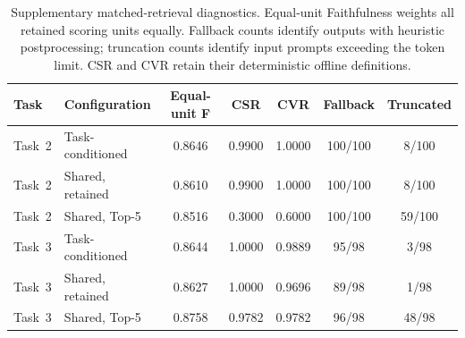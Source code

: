 \begin{table}[ht]
\centering
\scriptsize
\caption{Supplementary matched-retrieval diagnostics. Equal-unit Faithfulness weights all retained scoring units equally. Fallback counts identify outputs with heuristic postprocessing; truncation counts identify input prompts exceeding the token limit. CSR and CVR retain their deterministic offline definitions.}
\label{tab:single-pipeline-rag-baseline}
\setlength{\tabcolsep}{3pt}
\renewcommand{\arraystretch}{1.08}
\begin{tabular}{@{}l l c c c c c@{}}
\toprule
\textbf{Task} & \textbf{Configuration} & \textbf{Equal-unit F} & \textbf{CSR} & \textbf{CVR} & \textbf{Fallback} & \textbf{Truncated} \\
\midrule
Task~2 & Task-conditioned & 0.8646 & 0.9900 & 1.0000 & 100/100 & 8/100 \\
Task~2 & Shared, retained & 0.8610 & 0.9900 & 1.0000 & 100/100 & 8/100 \\
Task~2 & Shared, Top-5 & 0.8516 & 0.3000 & 0.6000 & 100/100 & 59/100 \\
\addlinespace
Task~3 & Task-conditioned & 0.8644 & 1.0000 & 0.9889 & 95/98 & 3/98 \\
Task~3 & Shared, retained & 0.8627 & 1.0000 & 0.9696 & 89/98 & 1/98 \\
Task~3 & Shared, Top-5 & 0.8758 & 0.9782 & 0.9782 & 96/98 & 48/98 \\
\bottomrule
\end{tabular}
\end{table}

